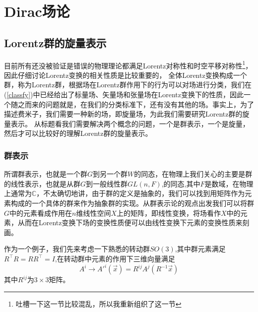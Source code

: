 \chapter{Dirac场论}
\section{Lorentz群的旋量表示}
目前所有还没被验证是错误的物理理论都满足Lorentz对称性和时空平移对称性\footnote{吐槽一下这一节比较混乱，所以我重新组织了这一节}，因此仔细讨论Lorentz变换的相关性质是比较重要的，
全体Lorentz变换构成一个群，称为Lorentz群，根据场在Lorentz群作用下的行为可以对场进行分类，我们在(\ref{classfy})中已经给出了标量场、矢量场和张量场在Lorentz变换下的性质，因此一个随之而来的问题就是，在我们的分类标准下，还有没有其他的场。事实上，为了描述费米子，我们需要一种新的场，即旋量场，为此我们需要研究Lorentz群的旋量表示。
从标题看我们需要解决两个概念的问题，一个是群表示，一个是旋量，然后才可以比较好的理解Lorentz群的旋量表示。
\subsection{群表示}
所谓群表示，也就是一个群$G$到另一个群$W$的同态，在物理上我们关心的主要是群的线性表示，也就是从群$G$到一般线性群$GL(n,F)$,的同态,其中$F$是数域，在物理上通常为$\mathbb{C}$，不太确切地讲，由于群的定义是抽象的，我们可以找到用矩阵作为元素构成的一个具体的群来作为抽象群的实现。从群表示论的观点出发我们可以将群$G$中的元素看成作用在$n$维线性空间$X$上的矩阵，即线性变换，将场看作$X$中的元素，从而在Lorentz变换下场的变换性质便可以由线性变换下元素的变换性质来刻画。

作为一个例子，我们先来考虑一下熟悉的转动群$SO(3)$,其中群元素满足$R^{\top}R=RR^{\top}=I$,在转动群中元素的作用下三维向量满足
\begin{equation}
    A^{i}\longrightarrow A'^{i}(\vec{x})=R^{ij}A^{j}(R^{-1}\vec{x})
\end{equation}
其中$R^{ij}$为$3\times3$矩阵。

